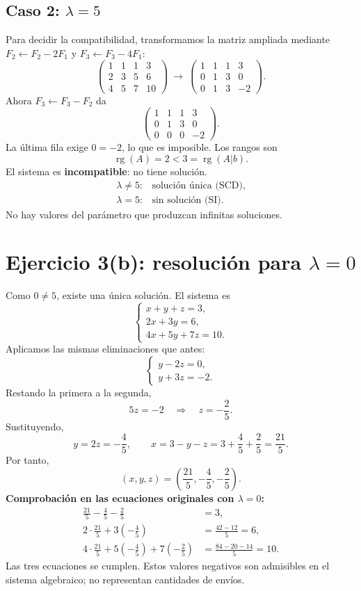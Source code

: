 \documentclass[11pt]{article}
\begin{document}
\subsection*{Caso 2: $\lambda=5$}
Para decidir la compatibilidad, transformamos la matriz ampliada mediante $F_2\leftarrow F_2-2F_1$ y $F_3\leftarrow F_3-4F_1$:
\[
\left(\begin{array}{ccc|c}1&1&1&3\\2&3&5&6\\4&5&7&10\end{array}\right)
\ \longrightarrow\ 
\left(\begin{array}{ccc|c}1&1&1&3\\0&1&3&0\\0&1&3&-2\end{array}\right).
\]
Ahora $F_3\leftarrow F_3-F_2$ da
\[
\left(\begin{array}{ccc|c}1&1&1&3\\0&1&3&0\\0&0&0&-2\end{array}\right).
\]
La última fila exige $0=-2$, lo que es imposible. Los rangos son
\[\operatorname{rg}(A)=2<3=\operatorname{rg}(A|b).\]
El sistema es \textbf{incompatible}: no tiene solución.
\[
\boxed{\begin{array}{ll}\lambda\neq5:&\text{solución única (SCD)},\\\lambda=5:&\text{sin solución (SI)}.\end{array}}
\]
No hay valores del parámetro que produzcan infinitas soluciones.
\clearpage
\section*{Ejercicio 3(b): resolución para $\lambda=0$}
Como $0\neq5$, existe una única solución. El sistema es
\[
\begin{cases}x+y+z=3,\\2x+3y=6,\\4x+5y+7z=10.\end{cases}
\]
Aplicamos las mismas eliminaciones que antes:
\[
\begin{cases}y-2z=0,\\y+3z=-2.\end{cases}
\]
Restando la primera a la segunda,
\[5z=-2\quad\Longrightarrow\quad z=-\frac25.\]
Sustituyendo,
\[y=2z=-\frac45,\qquad x=3-y-z=3+\frac45+\frac25=\frac{21}5.\]
Por tanto,
\[\boxed{(x,y,z)=\left(\frac{21}5,-\frac45,-\frac25\right)}.\]
\textbf{Comprobación en las ecuaciones originales con $\lambda=0$:}
\begin{align*}
\frac{21}5-\frac45-\frac25&=3,\\
2\cdot\frac{21}5+3\left(-\frac45\right)&=\frac{42-12}5=6,\\
4\cdot\frac{21}5+5\left(-\frac45\right)+7\left(-\frac25\right)&=\frac{84-20-14}5=10.
\end{align*}
Las tres ecuaciones se cumplen. Estos valores negativos son admisibles en el sistema algebraico; no representan cantidades de envíos.
\end{document}
